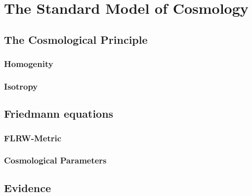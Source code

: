 \chapter{The Standard Model of Cosmology}
\thispagestyle{empty}

\bt

\section{The Cosmological Principle}

\subsection{Homogenity}

\subsection{Isotropy}

\section{Friedmann equations}

\subsection{FLRW-Metric}

\subsection{Cosmological Parameters}

\section{Evidence}
